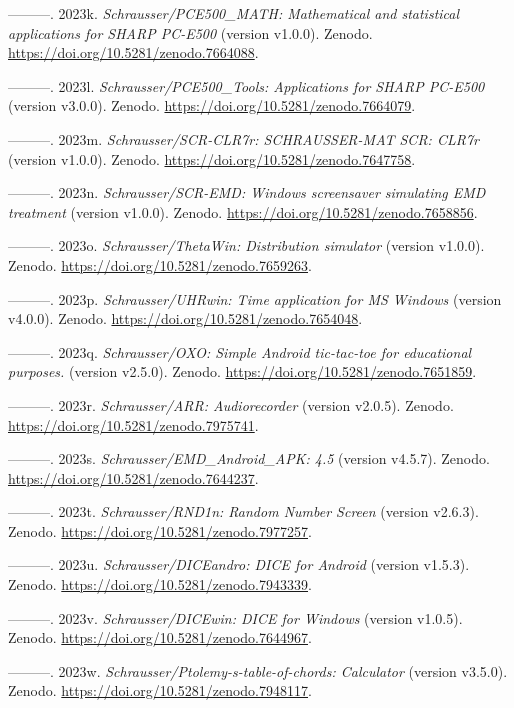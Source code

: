 \documentclass[
]{article}
\newlength{\cslhangindent}
\newlength{\cslentryspacingunit} %
\newenvironment{CSLReferences}[2] %
 {%
  \setlength{\parindent}{0pt}
  \ifodd #1
  \let\oldpar\par
  \def\par{\hangindent=\cslhangindent\oldpar}
  \fi
  \setlength{\parskip}{#2\cslentryspacingunit}
 }%
 {}
\begin{document}
\begin{CSLReferences}{1}{0}
\leavevmode{}%
---------. 2023k. \emph{{Schrausser/PCE500\_MATH: Mathematical and
statistical applications for SHARP PC-E500}} (version v1.0.0). Zenodo.
\url{https://doi.org/10.5281/zenodo.7664088}.

\leavevmode{}%
---------. 2023l. \emph{{Schrausser/PCE500\_Tools: Applications for
SHARP PC-E500}} (version v3.0.0). Zenodo.
\url{https://doi.org/10.5281/zenodo.7664079}.

\leavevmode{}%
---------. 2023m. \emph{{Schrausser/SCR-CLR7r: SCHRAUSSER-MAT SCR:
CLR7r}} (version v1.0.0). Zenodo.
\url{https://doi.org/10.5281/zenodo.7647758}.

\leavevmode{}%
---------. 2023n. \emph{{Schrausser/SCR-EMD: Windows screensaver
simulating EMD treatment}} (version v1.0.0). Zenodo.
\url{https://doi.org/10.5281/zenodo.7658856}.

\leavevmode{}%
---------. 2023o. \emph{{Schrausser/ThetaWin: Distribution simulator}}
(version v1.0.0). Zenodo. \url{https://doi.org/10.5281/zenodo.7659263}.

\leavevmode{}%
---------. 2023p. \emph{{Schrausser/UHRwin: Time application for MS
Windows}} (version v4.0.0). Zenodo.
\url{https://doi.org/10.5281/zenodo.7654048}.

\leavevmode{}%
---------. 2023q. \emph{{Schrausser/OXO: Simple Android tic-tac-toe for
educational purposes.}} (version v2.5.0). Zenodo.
\url{https://doi.org/10.5281/zenodo.7651859}.

\leavevmode{}%
---------. 2023r. \emph{{Schrausser/ARR: Audiorecorder}} (version
v2.0.5). Zenodo. \url{https://doi.org/10.5281/zenodo.7975741}.

\leavevmode{}%
---------. 2023s. \emph{{Schrausser/EMD\_Android\_APK: 4.5}} (version
{v4.5.7}). Zenodo. \url{https://doi.org/10.5281/zenodo.7644237}.

\leavevmode{}%
---------. 2023t. \emph{{Schrausser/RND1n: Random Number Screen}}
(version v2.6.3). Zenodo. \url{https://doi.org/10.5281/zenodo.7977257}.

\leavevmode{}%
---------. 2023u. \emph{{Schrausser/DICEandro: DICE for Android}}
(version v1.5.3). Zenodo. \url{https://doi.org/10.5281/zenodo.7943339}.

\leavevmode{}%
---------. 2023v. \emph{{Schrausser/DICEwin: DICE for Windows}} (version
{v1.0.5}). Zenodo. \url{https://doi.org/10.5281/zenodo.7644967}.

\leavevmode{}%
---------. 2023w. \emph{{Schrausser/Ptolemy-s-table-of-chords:
Calculator}} (version v3.5.0). Zenodo.
\url{https://doi.org/10.5281/zenodo.7948117}.

\end{CSLReferences}
\end{document}
